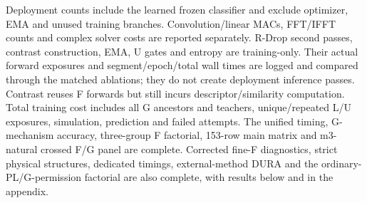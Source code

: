Deployment counts include the learned frozen classifier and exclude optimizer, EMA and unused training branches. Convolution/linear MACs, FFT/IFFT counts and complex solver costs are reported separately. R-Drop second passes, contrast construction, EMA, U gates and entropy are training-only. Their actual forward exposures and segment/epoch/total wall times are logged and compared through the matched ablations; they do not create deployment inference passes. Contrast reuses F forwards but still incurs descriptor/similarity computation. Total training cost includes all G ancestors and teachers, unique/repeated L/U exposures, simulation, prediction and failed attempts. The unified timing, G-mechanism accuracy, three-group F factorial, 153-row main matrix and m3-natural crossed F/G panel are complete. Corrected fine-F diagnostics, strict physical structures, dedicated timings, external-method DURA and the ordinary-PL/G-permission factorial are also complete, with results below and in the appendix.












